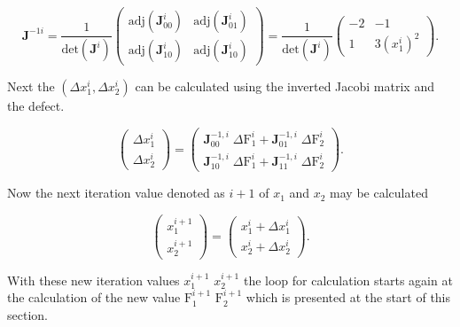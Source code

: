 \documentclass[a4paper, twoside, 11pt]{article}
\begin{document}
    \begin{equation}
        \textbf{J}^{-1i} =
        \frac{1}{\text{det}(\textbf{J}^i)}
        \begin{pmatrix}
            \text{adj}(\textbf{J}^i_{00}) & \text{adj}(\textbf{J}^i_{01})\\
            \text{adj}(\textbf{J}^i_{10}) & \text{adj}(\textbf{J}^i_{10})
        \end{pmatrix}
        =
        \frac{1}{\text{det}(\textbf{J}^i)}
        \begin{pmatrix}
            -2 & -1\\
            1 & 3 (x_1^i)^2
        \end{pmatrix}.
    \end{equation}
\par
    Next the $(\Delta x_1^i, \Delta x_2^i)$ can be calculated using the inverted Jacobi matrix and the defect.

    \begin{equation}
        \begin{pmatrix}
            \Delta x_1^i \\
            \Delta x_2^i
        \end{pmatrix}
        =
        \begin{pmatrix}
            \textbf{J}_{00}^{-1,i} \;\Delta \text{F}_1^i + \textbf{J}_{01}^{-1,i} \;\Delta \text{F}_2^i\\ 
            \textbf{J}_{10}^{-1,i} \;\Delta \text{F}_1^i + \textbf{J}_{11}^{-1,i} \;\Delta \text{F}_2^i
        \end{pmatrix}.
    \end{equation}

    \par
    Now the next iteration value denoted as $i+1$ of $x_1$ and $x_2$ may be calculated

    \begin{equation}
        \begin{pmatrix}
            x_1^{i+1}\\
            x_2^{i+1}
        \end{pmatrix}
        =
        \begin{pmatrix}
            x_1^i + \Delta x_1^i\\
            x_2^i + \Delta x_2^i
        \end{pmatrix}.
    \end{equation}
\par
    With these new iteration values $x_1^{i+1}$ $x_2^{i+1}$ the loop for calculation starts again at the calculation of the new value $\text{F}_1^{i+1}$ $\text{F}_2^{i+1}$ which is presented at the start of this section.
\end{document}
